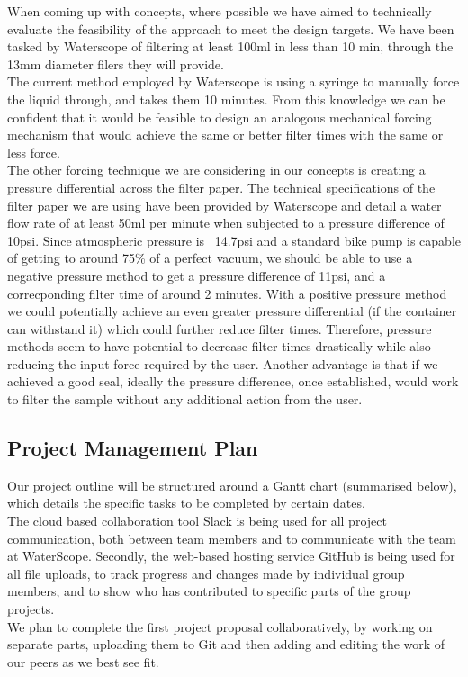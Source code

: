 \documentclass[12pt]{article}
\begin{document}
When coming up with concepts, where possible we have aimed to technically evaluate the feasibility of the approach to meet the design targets. We have been tasked by Waterscope of filtering at least 100ml in less than 10 min, through the 13mm diameter filers they will provide. \\
The current method employed by Waterscope is using a syringe to manually force the liquid through, and takes them 10 minutes. From this knowledge we can be confident that it would be feasible to design an analogous mechanical forcing mechanism that would achieve the same or better filter times with the same or less force. \\
The other forcing technique we are considering in our concepts is creating a pressure differential across the filter paper. The technical specifications of the filter paper we are using have been provided by Waterscope and detail a water flow rate of at least 50ml per minute when subjected to a pressure difference of 10psi. Since atmospheric pressure is ~14.7psi and a standard bike pump is capable of getting to around 75\% of a perfect vacuum, we should be able to use a negative pressure method to get a pressure difference of 11psi, and a correcponding filter time of around 2 minutes. With a positive pressure method we could potentially achieve an even greater pressure differential (if the container can withstand it) which could further reduce filter times. Therefore, pressure methods seem to have potential to decrease filter times drastically while also reducing the input force required by the user. Another advantage is that if we achieved a good seal, ideally the pressure difference, once established, would work to filter the sample without any additional action from the user.  

\subsection{Project Management Plan}
Our project outline will be structured around a Gantt chart (summarised below), which details the specific tasks to be completed by certain dates.\\
The cloud based collaboration tool Slack is being used for all project communication, both between team members and to communicate with the team at WaterScope. Secondly, the web-based hosting service GitHub is being used for all file uploads, to track progress and changes made by individual group members, and to show who has contributed to specific parts of the group projects.\\
We plan to complete the first project proposal collaboratively, by working on separate parts, uploading them to Git and then adding and editing the work of our peers as we best see fit.
\end{document}
